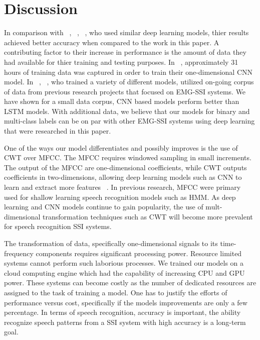 \documentclass[conference]{IEEEtran}
\begin{document}
\section{Discussion}

In comparison with  ~\cite{janke_emg--speech:_2017}, ~\cite{kapur_alterego:_2018}, ~\cite{diener_session-independent_nodate}, who used similar deep learning models, thier results achieved better accuracy when compared to the work in this paper. A  contributing factor to their increase in performance is the amount of data they had available for thier training and testing purposes. In ~\cite{kapur_alterego:_2018}, approximately 31 hours of training data was captured in order to train their one-dimensional CNN model. In ~\cite{janke_emg--speech:_2017}, ~\cite{diener_session-independent_nodate}, who trained a variety of different models, utilized on-going corpus of data from previous research projects that focused on EMG-SSI systems. We have shown for a small data corpus, CNN based models perform better than LSTM models. With additional data, we believe that our models for binary and multi-class labels can be on par with other EMG-SSI systems using deep learning that were researched in this paper.

One of the ways our model differentiates and possibly improves is the use of CWT over MFCC. The MFCC requires windowed sampling in small increments. The output of the MFCC are one-dimensional coefficients, while CWT outputs coefficients in two-dimensions, allowing deep learning models such as CNN to learn and extract more features ~\cite{huzaifah_comparison_2017}. In previous research, MFCC were primary used for shallow learning speech recognition models such as HMM. As deep learning and CNN models continue to gain popularity, the use of mult-dimensional transformation techniques such as CWT will become more prevalent for speech recognition SSI systems. 

The transformation of data, specifically one-dimensional signals to its time-frequency components requires significant processing power. Resource limited systems cannot perform such laborious processes. We trained our models on a cloud computing engine which had the capability of increasing CPU and GPU power. These systems can become costly as the number of dedicated resources are assigned to the task of training a model. One has to justify the efforts of performance versus cost, specifically if the models improvements are only a few percentage. In terms of speech recognition, accuracy is important, the ability recognize speech patterns from a SSI system with high accuracy is a long-term goal.  
\end{document}
